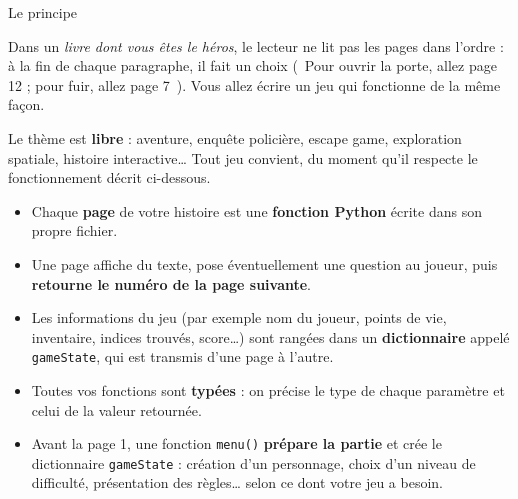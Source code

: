 \documentclass[11pt,a4paper]{article}
\makeatletter
\renewcommand\section{\@startsection{section}{1}{0pt}{1.6em}{0.8em}%
  {\Large\bfseries\color{nuit}}}
\newcommand{\guil}[1]{\guillemotleft~#1~\guillemotright}
\makeatother
\begin{document}
\thispagestyle{empty}

\vspace*{4.2cm}

\section{Le principe}

Dans un \emph{livre dont vous êtes le héros}, le lecteur ne lit pas les pages dans l'ordre :
à la fin de chaque paragraphe, il fait un choix (\guil{Pour ouvrir la porte, allez page 12 ;
pour fuir, allez page 7}). Vous allez écrire un jeu qui fonctionne de la même façon.

Le thème est \textbf{libre} : aventure, enquête policière, escape game, exploration
spatiale, histoire interactive\dots{} Tout jeu convient, du moment qu'il respecte le
fonctionnement décrit ci-dessous.

\begin{itemize}
  \item Chaque \textbf{page} de votre histoire est une \textbf{fonction Python} écrite
        dans son propre fichier.
  \item Une page affiche du texte, pose éventuellement une question au joueur, puis
        \textbf{retourne le numéro de la page suivante}.
  \item Les informations du jeu (par exemple nom du joueur, points de vie, inventaire,
        indices trouvés, score\dots{}) sont rangées dans un \textbf{dictionnaire} appelé \texttt{gameState}, qui est
        transmis d'une page à l'autre.
  \item Toutes vos fonctions sont \textbf{typées} : on précise le type de chaque
        paramètre et celui de la valeur retournée.
  \item Avant la page 1, une fonction \texttt{menu()} \textbf{prépare la partie} et crée
        le dictionnaire \texttt{gameState} : création d'un personnage, choix d'un niveau
        de difficulté, présentation des règles\dots{} selon ce dont votre jeu a besoin.
\end{itemize}
\end{document}
